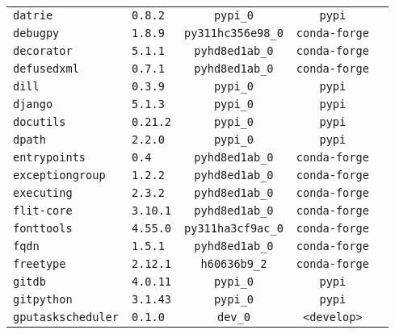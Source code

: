 \begin{longtable}{p{}|l|ccc}
\texttt{datrie}                    & \texttt{0.8.2}              & \texttt{pypi\_0}          & \texttt{pypi}\\
\texttt{debugpy}                   & \texttt{1.8.9}              & \texttt{py311hc356e98\_0} & \texttt{conda-forge}\\
\texttt{decorator}                 & \texttt{5.1.1}              & \texttt{pyhd8ed1ab\_0}    & \texttt{conda-forge}\\
\texttt{defusedxml}                & \texttt{0.7.1}              & \texttt{pyhd8ed1ab\_0}    & \texttt{conda-forge}\\
\texttt{dill}                      & \texttt{0.3.9}              & \texttt{pypi\_0}          & \texttt{pypi}\\
\texttt{django}                    & \texttt{5.1.3}              & \texttt{pypi\_0}          & \texttt{pypi}\\
\texttt{docutils}                  & \texttt{0.21.2}             & \texttt{pypi\_0}          & \texttt{pypi}\\
\texttt{dpath}                     & \texttt{2.2.0}              & \texttt{pypi\_0}          & \texttt{pypi}\\
\texttt{entrypoints}               & \texttt{0.4}                & \texttt{pyhd8ed1ab\_0}    & \texttt{conda-forge}\\
\texttt{exceptiongroup}            & \texttt{1.2.2}              & \texttt{pyhd8ed1ab\_0}    & \texttt{conda-forge}\\
\texttt{executing}                 & \texttt{2.3.2}              & \texttt{pyhd8ed1ab\_0}    & \texttt{conda-forge}\\
\texttt{flit-core}        & \texttt{3.10.1}      & \texttt{pyhd8ed1ab\_0}   & \texttt{conda-forge}\\
\texttt{fonttools}        & \texttt{4.55.0}      & \texttt{py311ha3cf9ac\_0} & \texttt{conda-forge}\\
\texttt{fqdn}             & \texttt{1.5.1}       & \texttt{pyhd8ed1ab\_0}   & \texttt{conda-forge}\\
\texttt{freetype}         & \texttt{2.12.1}      & \texttt{h60636b9\_2}     & \texttt{conda-forge}\\
\texttt{gitdb}            & \texttt{4.0.11}      & \texttt{pypi\_0}         & \texttt{pypi}\\
\texttt{gitpython}        & \texttt{3.1.43}      & \texttt{pypi\_0}         & \texttt{pypi}\\
\texttt{gputaskscheduler} & \texttt{0.1.0}       & \texttt{dev\_0}          & \texttt{<develop>}\\

\end{longtable}
